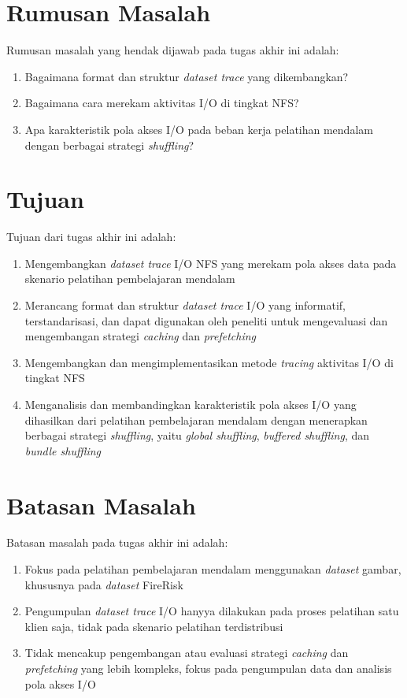 \section{Rumusan Masalah}

Rumusan masalah yang hendak dijawab pada tugas akhir ini adalah:

\begin{enumerate}
    \item Bagaimana format dan struktur \textit{dataset trace} yang dikembangkan?
    \item Bagaimana cara merekam aktivitas I/O di tingkat NFS?
    \item Apa karakteristik pola akses I/O pada beban kerja pelatihan mendalam dengan berbagai strategi \textit{shuffling}?
\end{enumerate}

\section{Tujuan}

Tujuan dari tugas akhir ini adalah:

\begin{enumerate}
    \item Mengembangkan \textit{dataset trace} I/O NFS yang merekam pola akses data pada skenario pelatihan pembelajaran mendalam
    \item Merancang format dan struktur \textit{dataset trace} I/O yang informatif, terstandarisasi, dan dapat digunakan oleh peneliti untuk mengevaluasi dan mengembangan strategi \textit{caching} dan \textit{prefetching}
    \item Mengembangkan dan mengimplementasikan metode \textit{tracing} aktivitas I/O di tingkat NFS
    \item Menganalisis dan membandingkan karakteristik pola akses I/O yang dihasilkan dari pelatihan pembelajaran mendalam dengan menerapkan berbagai strategi \textit{shuffling}, yaitu \textit{global shuffling}, \textit{buffered shuffling}, dan \textit {bundle shuffling}
\end{enumerate}

\section{Batasan Masalah}

Batasan masalah pada tugas akhir ini adalah:

\begin{enumerate}
    \item Fokus pada pelatihan pembelajaran mendalam menggunakan \textit{dataset} gambar, khususnya pada \textit{dataset} FireRisk
    \item Pengumpulan \textit{dataset trace} I/O hanyya dilakukan pada proses pelatihan satu klien saja, tidak pada skenario pelatihan terdistribusi
    \item Tidak mencakup pengembangan atau evaluasi strategi \textit{caching} dan \textit{prefetching} yang lebih kompleks, fokus pada pengumpulan data dan analisis pola akses I/O
\end{enumerate}


